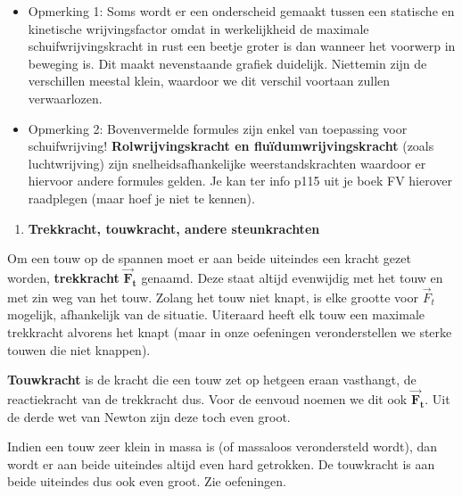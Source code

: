 \documentclass{ximera}
\newcommand{\ul}[1]{#1}
\begin{document}

\begin{itemize}
\item
  Opmerking 1: Soms wordt er een onderscheid gemaakt tussen een
  statische en kinetische wrijvingsfactor omdat in werkelijkheid de
  maximale schuifwrijvingskracht in rust een beetje groter is dan
  wanneer het voorwerp in beweging is. Dit maakt nevenstaande grafiek
  duidelijk. Niettemin zijn de verschillen meestal klein, waardoor we
  dit verschil voortaan zullen verwaarlozen.
\item
  Opmerking 2: Bovenvermelde formules zijn enkel van toepassing voor
  \ul{schuif}wrijving! \textbf{Rolwrijvingskracht en
  fluïdumwrijvingskracht} (zoals luchtwrijving) zijn
  snelheidsafhankelijke weerstandskrachten waardoor er hiervoor andere
  formules gelden. Je kan ter info p115 uit je boek FV hierover
  raadplegen (maar hoef je niet te kennen).
\end{itemize}

\begin{enumerate}
\def\labelenumi{\arabic{enumi}.}
\setcounter{enumi}{8}
\item
  \textbf{Trekkracht, touwkracht, andere steunkrachten}
\end{enumerate}

Om een touw op de spannen moet er aan beide uiteindes een kracht gezet
worden, \textbf{trekkracht}
\({\overrightarrow{\mathbf{F}}}_{\mathbf{t}}\) genaamd. Deze staat
altijd evenwijdig met het touw en met zin weg van het touw. Zolang het
touw niet knapt, is elke grootte voor \({\overrightarrow{F}}_{t}\)
mogelijk, afhankelijk van de situatie. Uiteraard heeft elk touw een
maximale trekkracht alvorens het knapt (maar in onze oefeningen
veronderstellen we sterke touwen die niet knappen).

\textbf{Touwkracht} is de kracht die een touw zet op hetgeen eraan
vasthangt, de reactiekracht van de trekkracht dus. Voor de eenvoud
noemen we dit ook \({\overrightarrow{\mathbf{F}}}_{\mathbf{t}}\). Uit de
derde wet van Newton zijn deze toch even groot.

Indien een touw zeer klein in massa is (of massaloos verondersteld
wordt), dan wordt er aan beide uiteindes altijd even hard getrokken. De
touwkracht is aan beide uiteindes dus ook even groot. Zie oefeningen.
\end{document}
